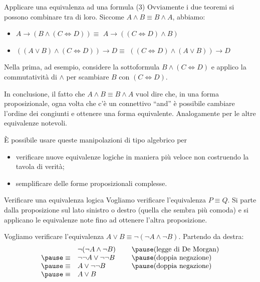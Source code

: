 \documentclass[aspectratio=169,10pt,dvipsnames,handout]{beamer}
\begin{document}
\begin{frame}{Applicare una equivalenza ad una formula (3)}
    Ovviamente i due teoremi si possono combinare tra di loro. Siccome $A \wedge B \equiv B \wedge A$, abbiamo:
    \begin{itemize}
        \item $A \to (B \wedge (C \iff D))  \equiv$ \pause $A \to ((C \iff D) \wedge B)$ \pause
        \item $((A \vee B) \wedge (C \iff D)) \to D \equiv$ \pause $( (C \iff D) \wedge (A \vee B)) \to D$
    \end{itemize}

    \pause\medskip
    Nella prima, ad esempio, considere la sottoformula $B \wedge (C \iff D)$ e applico la commutatività di $\wedge$ per scambiare $B$ con $(C \iff D)$.

    \pause\medskip
    In conclusione, il fatto che $A \wedge B \equiv B \wedge A$ vuol dire che, in una forma proposizionale, ogna volta che c'è un connettivo ``and'' è possibile cambiare l'ordine dei congiunti e ottenere una forma equivalente. Analogamente per le altre equivalenze notevoli.

    \medskip
    È possibile usare queste manipolazioni di tipo algebrico per
    \begin{itemize}
        \item verificare nuove equivalenze logiche in maniera più veloce non costruendo la tavola di verità;
        \item semplificare delle forme proposizionali complesse.
    \end{itemize}
\end{frame}

\begin{frame}{Verificare una equivalenza logica}
    Vogliamo verificare l'equivalenza $P \equiv Q$.  Si parte dalla proposizione sul lato sinistro o destro (quella che sembra più comoda) e si applicano le equivalenze note fino ad ottenere l'altra proposizione.

    \begin{example}
        Vogliamo verificare l'equivalenza $A \vee B \equiv \neg(\neg A \wedge \neg B)$. Partendo da destra:
        \[
            \begin{array}{rl@{\hspace{0.8cm}}l}
                              & \neg(\neg A \wedge \neg B) & \pause \text{(legge di De Morgan)} \\
                \pause \equiv & \neg\neg A \vee \neg\neg B & \pause \text{(doppia negazione)}   \\
                \pause \equiv & A \vee \neg\neg B          & \pause \text{(doppia negazione)}   \\
                \pause \equiv & A \vee B
            \end{array}
        \]
    \end{example}
\end{frame}
\end{document}
